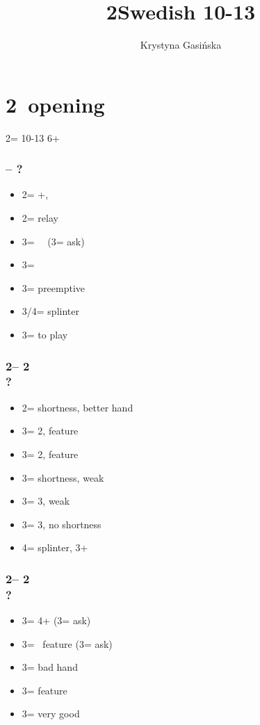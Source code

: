 \documentclass[12pt, a4paper]{article}
\title{2\major Swedish 10-13}
\author{Krystyna Gasińska}
\begin{document}
\maketitle

\section*{\colorbox{blue!30}{2\hearts\ opening}}
 {

    2\hearts = 10-13 6+\hearts

    \subsubsection*{\alrts{2\hearts} -- ?}
    \begin{itemize}
        \item 2\spades = +, \fton{3\major}
        \item 2\nt = relay
        \item 3\clubs = \minor\ \gf\ (3\diams = ask)
        \item 3\diams = \hearts\ \invp
        \item 3\hearts = preemptive
        \item 3\spades/4\minor = splinter
        \item 3\nt = to play
    \end{itemize}

    \subsubsection*{2\hearts -- 2\spades\\
                    ?}
    \begin{itemize}
        \item 2\nt = \spades shortness, better hand
        \item 3\clubs = 2\spades, \clubs feature
        \item 3\diams = 2\spades, \diams feature
        \item 3\hearts = \spades shortness, weak
        \item 3\spades = 3\spades, weak
        \item 3\nt = 3\spades, no shortness
        \item 4\minor = splinter, 3+\spades
    \end{itemize}

    \subsubsection*{2\hearts -- 2\nt\\
                    ?}
    \begin{itemize}
        \item 3\clubs = 4+\twosuit{\minor}{\spades} (3\diams = ask)
        \item 3\diams = \minor\ feature (3\hearts = ask)
        \item 3\hearts = bad hand
        \item 3\spades = \spades feature
        \item 3\nt = very good \hearts
    \end{itemize}

}
\end{document}
